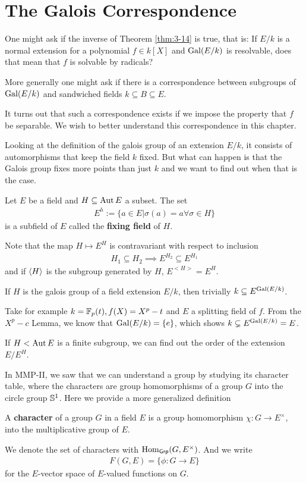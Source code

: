 \section{The Galois Correspondence}

One might ask if the inverse of Theorem \ref{thm:3-14} is true, that is: 
If $E/k$ is a normal extension for a polynomial $f \in k[X]$ and $\operatorname{Gal}(E/k)$ is resolvable, does that mean that $f$ is solvable by radicals?

More generally one might ask if there is a correspondence between subgroups of $\operatorname{Gal}(E/k)$ and sandwiched fields $k \subseteq B \subseteq E$.

It turns out that such a correspondence exists if we impose the property that $f$ be separable.
We wish to better understand this correspondence in this chapter.

Looking at the definition of the galois group of an extension $E/k$, it consists of automorphisms that keep the field $k$ fixed.
But what can happen is that the Galois group fixes more points than just $k$ and we want to find out when that is the case.

\begin{dfn}[]
  Let $E$ be a field and $H \subseteq \operatorname{Aut} E$ a subset. The set
  \begin{align*}
    E^{h} := \{a \in E \big\vert \sigma(a) = a \forall \sigma \in H\}
  \end{align*}
  is a subfield of $E$ called the \textbf{fixing field} of $H$.
\end{dfn}
Note that the map $H \mapsto E^{H}$ is contravariant with respect to inclusion
\begin{align*}
  H_1 \subseteq H_2 \implies E^{H_2} \subseteq E^{H_1}
\end{align*}
and if $\langle H\rangle$ is the subgroup generated by $H$, $E^{<H>} = E^{H}$.

If $H$ is the galois group of a field extension $E/k$, then trivially $k \subseteq E^{\operatorname{Gal}(E/k)}$.

\begin{ex}[]
  Take for example $k = \mathbb{F}_p(t), f(X) = X^{p}-t$ and $E$ a splitting field of $f$.
  From the $X^{p}-c$ Lemma, we know that $\operatorname{Gal}(E/k) = \{e\}$, which shows $k \subsetneq E^{\operatorname{Gal}(E/k)} = E$.
\end{ex}

If $H < \operatorname{Aut} E$ is a finite subgroup, we can find out the order of the extension $E/E^{H}$.


In MMP-II, we saw that we can understand a group by studying its character table, where the characters are group homomorphisms of a group $G$ into the circle group $\mathbb{S}^{1}$. 
Here we provide a more generalized definition
\begin{dfn}[]
  A \textbf{character} of a group $G$ in a field $E$ is a group homomorphism $\chi: G \to  E^{\times}$, into the multiplicative group of $E$.

  We denote the set of characters with $\operatorname{Hom}_{\text{\sffamily Grp}}(G,E^{\times})$.
  And we write
  \begin{align*}
    F(G,E) = \{\phi: G \to E\}
  \end{align*}
  for the $E$-vector space of $E$-valued functions on $G$.
\end{dfn}


